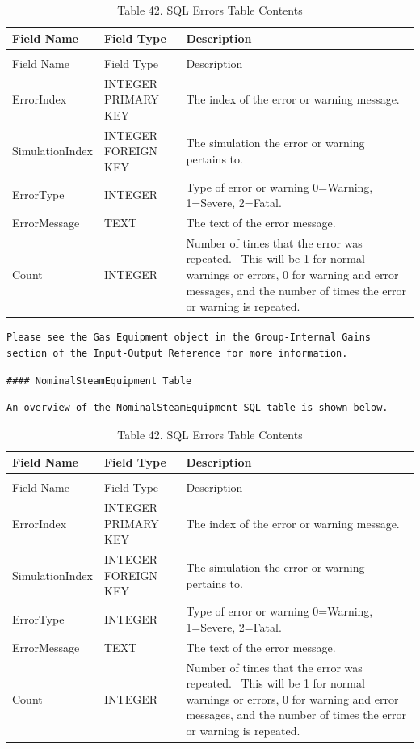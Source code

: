 \begin{longtable}[c]{p{1.5in}p{1.5in}p{2.99in}}
\caption{Table 42. SQL Errors Table Contents \label{table:table-42.-sql-errors-table-contents}} \tabularnewline
\toprule 
Field Name & Field Type & Description \tabularnewline
\midrule
\endfirsthead

\caption[]{Table 42. SQL Errors Table Contents} \tabularnewline
\toprule 
Field Name & Field Type & Description \tabularnewline
\midrule
\endhead

ErrorIndex & INTEGER PRIMARY KEY & The index of the error or warning message. \tabularnewline
SimulationIndex & INTEGER FOREIGN KEY & The simulation the error or warning pertains to. \tabularnewline
ErrorType & INTEGER & Type of error or warning 0=Warning, 1=Severe, 2=Fatal. \tabularnewline
ErrorMessage & TEXT & The text of the error message. \tabularnewline
Count & INTEGER & Number of times that the error was repeated.~ This will be 1 for normal warnings or errors, 0 for warning and error messages, and the number of times the error or warning is repeated. \tabularnewline
\bottomrule
\end{longtable}

\begin{lstlisting}
Please see the Gas Equipment object in the Group-Internal Gains section of the Input-Output Reference for more information.
\end{lstlisting}

\begin{lstlisting}
#### NominalSteamEquipment Table
\end{lstlisting}

\begin{lstlisting}
An overview of the NominalSteamEquipment SQL table is shown below.
\end{lstlisting}

\begin{longtable}[c]{p{1.5in}p{1.5in}p{2.99in}}
\caption{Table 42. SQL Errors Table Contents \label{table:table-42.-sql-errors-table-contents}} \tabularnewline
\toprule 
Field Name & Field Type & Description \tabularnewline
\midrule
\endfirsthead

\caption[]{Table 42. SQL Errors Table Contents} \tabularnewline
\toprule 
Field Name & Field Type & Description \tabularnewline
\midrule
\endhead

ErrorIndex & INTEGER PRIMARY KEY & The index of the error or warning message. \tabularnewline
SimulationIndex & INTEGER FOREIGN KEY & The simulation the error or warning pertains to. \tabularnewline
ErrorType & INTEGER & Type of error or warning 0=Warning, 1=Severe, 2=Fatal. \tabularnewline
ErrorMessage & TEXT & The text of the error message. \tabularnewline
Count & INTEGER & Number of times that the error was repeated.~ This will be 1 for normal warnings or errors, 0 for warning and error messages, and the number of times the error or warning is repeated. \tabularnewline
\bottomrule
\end{longtable}

